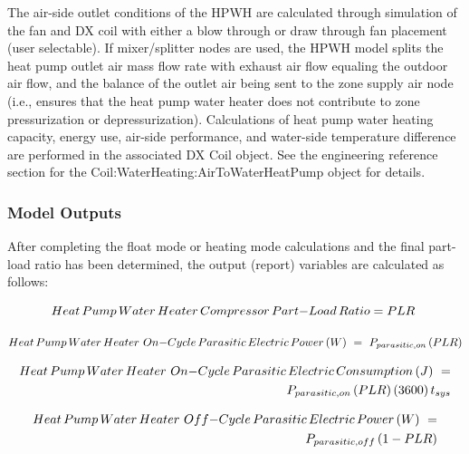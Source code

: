 The air-side outlet conditions of the HPWH are calculated through simulation of the fan and DX coil with either a blow through or draw through fan placement (user selectable). If mixer/splitter nodes are used, the HPWH model splits the heat pump outlet air mass flow rate with exhaust air flow equaling the outdoor air flow, and the balance of the outlet air being sent to the zone supply air node (i.e., ensures that the heat pump water heater does not contribute to zone pressurization or depressurization). Calculations of heat pump water heating capacity, energy use, air-side performance, and water-side temperature difference are performed in the associated DX Coil object. See the engineering reference section for the Coil:WaterHeating:AirToWaterHeatPump object for details.

\subsubsection{Model Outputs}\label{model-outputs-000}

After completing the float mode or heating mode calculations and the final part-load ratio has been determined, the output (report) variables are calculated as follows:

\begin{equation}
Heat\,Pump\,Water\,Heater\,Compressor\,Part{\rm{ - }}Load\,Ratio = PLR\,\,
\end{equation}

\begin{equation}
Heat\,Pump\,Water\,Heater\,\,On{\rm{ - }}Cycle\,Parasitic\,Electric\,Power\,(W)\,\, = \,\,{P_{parasitic,on}}\left( {PLR} \right)
\end{equation}

\begin{equation}
\begin{split}
Heat\,Pump\,Water\,Heater\,\,On{\rm{ - }}Cycle\,Parasitic\,Electric\,Consumption\,(J)\,\, = \\{P_{parasitic,on}}\left( {PLR} \right)\left( {3600} \right){t_{sys}}
\end{split}
\end{equation}

\begin{equation}
\begin{split}
Heat\,Pump\,Water\,Heater\,\,Off{\rm{ - }}Cycle\,Parasitic\,Electric\,Power\,(W)\,\, = \\{P_{parasitic,off}}\left( {1 - PLR} \right)
\end{split}
\end{equation}

